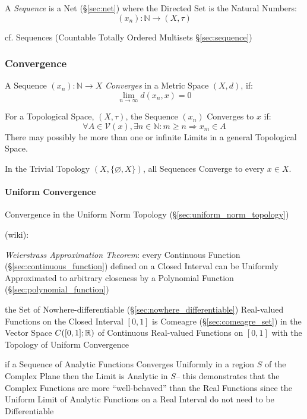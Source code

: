 A \emph{Sequence} is a Net (\S\ref{sec:net}) where the Directed Set is
the Natural Numbers:
\[
  (x_n) : \mathbb{N} \rightarrow (X,\tau)
\]

cf. Sequences (Countable Totally Ordered Multisets \S\ref{sec:sequence})



\subsubsection{Convergence}\label{sec:convergence}

A Sequence $(x_n) : \mathbb{N} \rightarrow X$ \emph{Converges} in a Metric
Space $(X,d)$, if:
\[
  \lim_{n \rightarrow \infty} d (x_n, x) = 0
\]

For a Topological Space, $(X,\tau)$, the Sequence $(x_n)$ Converges to
$x$ if:
\[
  \forall A \in \mathcal{V}(x), \exists n \in \mathbb{N}
  : m \geq n \Rightarrow x_m \in A
\]
There may possibly be more than one or infinite Limits in a general
Topological Space.

In the Trivial Topology $(X, \{\varnothing, X\})$, all Sequences
Converge to every $x \in X$.



\paragraph{Uniform Convergence}\label{sec:uniform_convergence}\hfill

Convergence in the Uniform Norm Topology (\S\ref{sec:uniform_norm_topology})

(wiki):

\emph{Weierstrass Approximation Theorem}: every Continuous Function
(\S\ref{sec:continuous_function}) defined on a Closed Interval can be Uniformly
Approximated to arbitrary closeness by a Polynomial Function
(\S\ref{sec:polynomial_function})

the Set of Nowhere-differentiable (\S\ref{sec:nowhere_differentiable})
Real-valued Functions on the Closed Interval $[0,1]$ is Comeagre
(\S\ref{sec:comeagre_set}) in the Vector Space $C([0,1]; \mathbb{R})$ of Continuous
Real-valued Functions on $[0,1]$ with the Topology of Uniform Convergence

if a Sequence of Analytic Functions Converges Uniformly in a region $S$ of the
Complex Plane then the Limit is Analytic in $S$-- this demonstrates that the
Complex Functions are more ``well-behaved'' than the Real Functions since the
Uniform Limit of Analytic Functions on a Real Interval do not need to be
Differentiable




